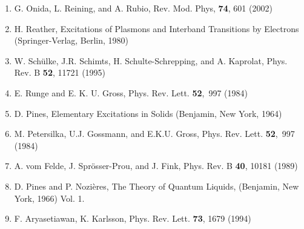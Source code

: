 \documentclass[12pt]{article}
\renewcommand{\_}{\kern-1.5pt\textunderscore\kern-1.5pt}
\begin{document}
\vspace{\baselineskip}
\setlength{\parskip}{9.96pt}

\vspace{\baselineskip}
\setlength{\parskip}{0.0pt}
\setlength{\parskip}{9.96pt}

\vspace{\baselineskip}
\setlength{\parskip}{0.0pt}
\setlength{\parskip}{9.96pt}

\vspace{\baselineskip}
\setlength{\parskip}{0.0pt}
\setlength{\parskip}{9.96pt}
\setlength{\parskip}{0.0pt}
\begin{enumerate}
	\item G. Onida, L. Reining, and A. Rubio, Rev. Mod. Phys, \textbf{74}, 601 (2002)\par

	\item H. Reather, Excitations of Plasmons and Interband Transitions by Electrons (Springer-Verlag, Berlin, 1980)\par

	\item W. Schülke, J.R. Schimts, H. Schulte-Schrepping, and A. Kaprolat, Phys. Rev. B \textbf{52}, 11721 (1995) \par

	\item E. Runge and E. K. U. Gross, Phys. Rev. Lett. \textbf{52},\ 997  (1984)\par

	\item D. Pines, Elementary Excitations in Solids (Benjamin, New York, 1964)\par

	\item M. Petersilka, U.J. Gossmann, and E.K.U. Gross, Phys. Rev. Lett. \textbf{52},\ 997  (1984)\par

	\item A. vom Felde, J. Sprösser-Prou, and J. Fink, Phys. Rev. B \textbf{40}, 10181 (1989)\par

	\item D. Pines and P. Nozières, The Theory of Quantum Liquids, (Benjamin, New York, 1966) Vol. 1.\par

	\item F. Aryasetiawan, K. Karlsson, Phys. Rev. Lett. \textbf{73}, 1679 (1994)\par


\end{enumerate}
\end{document}
